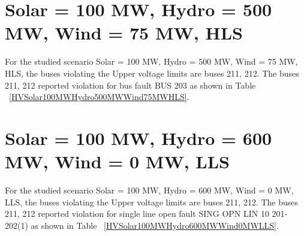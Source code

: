 \documentclass[10pt]{report}
\begin{document}
\section{Solar = 100 MW, Hydro = 500 MW, Wind = 75 MW, HLS}
For the studied scenario Solar = 100 MW, Hydro = 500 MW, Wind = 75 MW, HLS, the buses violating the Upper voltage limits are buses 211, 212.
The buses 211, 212 reported violation for bus fault BUS 203 as shown in Table ~\ref{HVSolar100MWHydro500MWWind75MWHLS}.
\begin{table}[H]
\caption{Contingencies reporting bus voltages greater than emergency voltage of 1.1 PU for scenario Solar = 100 MW, Hydro = 500 MW, Wind = 75 MW, HLS}
\label{HVSolar100MWHydro500MWWind75MWHLS}
\centering
{}
\end{table}


\section{Solar = 100 MW, Hydro = 600 MW, Wind = 0 MW, LLS}
For the studied scenario Solar = 100 MW, Hydro = 600 MW, Wind = 0 MW, LLS, the buses violating the Upper voltage limits are buses 211, 212.
The buses 211, 212 reported violation for single line open fault SING OPN LIN   10 201-202(1) as shown in Table ~\ref{HVSolar100MWHydro600MWWind0MWLLS}.
\begin{table}[H]
\caption{Contingencies reporting bus voltages greater than emergency voltage of 1.1 PU for scenario Solar = 100 MW, Hydro = 600 MW, Wind = 0 MW, LLS}
\label{HVSolar100MWHydro600MWWind0MWLLS}
\centering
{}
\end{table}
\end{document}
